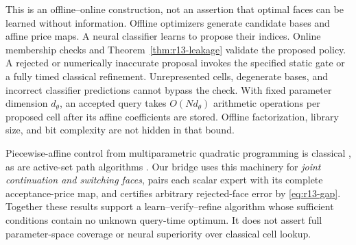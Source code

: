 This is an offline--online construction, not an assertion that optimal faces can be learned without information. Offline optimizers generate candidate bases and affine price maps. A neural classifier learns to propose their indices. Online membership checks and Theorem~\ref{thm:r13-leakage} validate the proposed policy. A rejected or numerically inaccurate proposal invokes the specified static gate or a fully timed classical refinement. Unrepresented cells, degenerate bases, and incorrect classifier predictions cannot bypass the check. With fixed parameter dimension $d_\theta$, an accepted query takes $O(Nd_\theta)$ arithmetic operations per proposed cell after its affine coefficients are stored. Offline factorization, library size, and bit complexity are not hidden in that bound.

Piecewise-affine control from multiparametric quadratic programming is classical \citep{Bemporad2002}, as are active-set path algorithms \citep{ArnoldTibshirani2016}. Our bridge uses this machinery for \emph{joint continuation and switching faces}, pairs each scalar expert with its complete acceptance-price map, and certifies arbitrary rejected-face error by \eqref{eq:r13-gap}. Together these results support a learn--verify--refine algorithm whose sufficient conditions contain no unknown query-time optimum. It does not assert full parameter-space coverage or neural superiority over classical cell lookup.

